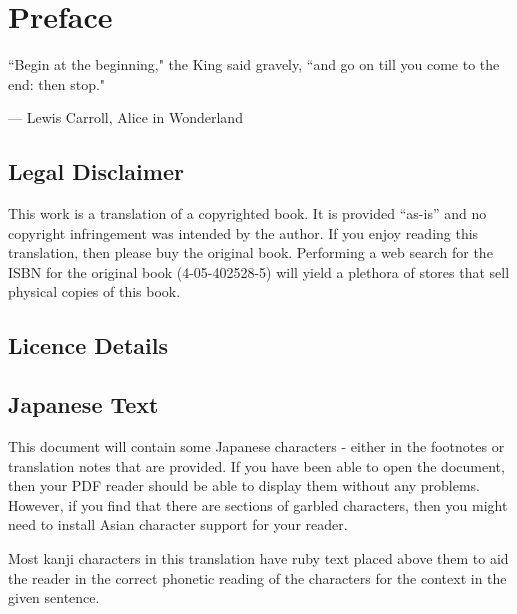 
\setcounter{footnote}{0}
\setcounter{endnote}{0}

\chapter*{Preface}

\epigraph{``Begin at the beginning," the King said gravely, ``and go on till you come to the end: then stop."}{--- \textup{Lewis Carroll}, Alice in Wonderland}

\section*{Legal Disclaimer}
This work is a translation of a copyrighted book. It is provided ``as-is'' and no copyright infringement was intended by the author. If you enjoy reading this translation, then please buy the original book. Performing a web search for the ISBN for the original book (4-05-402528-5) will yield a plethora of stores that sell physical copies of this book.

\section*{Licence Details}


\section*{Japanese Text}
This document will contain some Japanese characters - either in the footnotes or translation notes that are provided. If you have been able to open the document, then your PDF reader should be able to display them without any problems. However, if you find that there are sections of garbled characters, then you might need to install Asian character support for your reader.

\par Most kanji characters in this translation have ruby text placed above them to aid the reader in the correct phonetic reading of the characters for the context in the given sentence.

